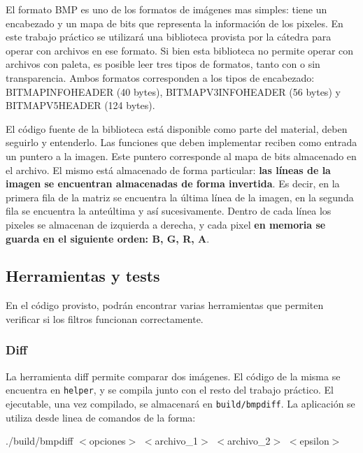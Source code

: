 \documentclass[a4paper, 12pt]{article}
\newcommand{\code}[1]{{\sffamily #1}\xspace}
\newenvironment{codesnippet}{%
	\begin{Sbox}\begin{minipage}{\textwidth}\sffamily\small}%
	{\end{minipage}\end{Sbox}%
		\begin{center}%
		\vspace{-0.4cm}\colorbox{litegrey}{\TheSbox}\end{center}\vspace{0.3cm}}
\begin{document}
El formato BMP es uno de los formatos de imágenes mas simples: tiene un encabezado y un mapa de bits que representa la información de los pixeles.
En este trabajo práctico se utilizará una biblioteca provista por la cátedra para operar con archivos en ese formato.
Si bien esta biblioteca no permite operar con archivos con paleta, es posible leer tres tipos de formatos, tanto con o sin transparencia.
Ambos formatos corresponden a los tipos de encabezado: BITMAPINFOHEADER (40 bytes), BITMAPV3INFOHEADER (56 bytes) y BITMAPV5HEADER (124 bytes).
\smallskip

El código fuente de la biblioteca está disponible como parte del material, deben seguirlo y entenderlo.
Las funciones que deben implementar reciben como entrada un puntero a la imagen. Este puntero corresponde al mapa de bits almacenado en el archivo.
El mismo está almacenado de forma particular: \textbf{las líneas de la imagen se encuentran almacenadas de forma invertida}.
Es decir, en la primera fila de la matriz se encuentra la última línea de la imagen, en la segunda fila se encuentra la anteúltima y así sucesivamente.
Dentro de cada línea los pixeles se almacenan de izquierda a derecha, y cada pixel \textbf{en memoria se guarda en el siguiente orden: B, G, R, A}.




\subsection{Herramientas y tests}

En el código provisto, podrán encontrar varias herramientas
que permiten verificar si los filtros funcionan correctamente.

\subsubsection*{Diff}
La herramienta \code{diff} permite comparar dos imágenes.
El código de la misma se encuentra en \texttt{helper}, y se
compila junto con el resto del trabajo práctico.
El ejecutable, una vez compilado, se almacenará en
\texttt{build/bmpdiff}.
La aplicación se utiliza desde linea de comandos de la forma:

\begin{codesnippet}
./build/bmpdiff $<$opciones$>$ $<$archivo_1$>$ $<$archivo_2$>$ $<$epsilon$>$
\end{codesnippet}
\end{document}
